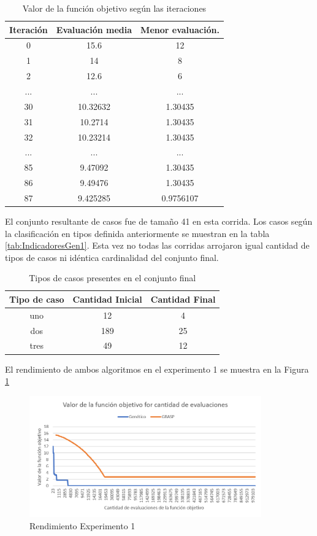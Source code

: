 \documentclass[a4paper,openright,11pt,oneside]{book}
\begin{document}
	\begin{table}[h]
		\begin{center}
			\begin{tabular}{| c | c | c |} \hline
				Iteración & Evaluación media & Menor evaluación. \\ \hline
				0 & 15.6 & 12 \\
				1 & 14 & 8 \\
				2 & 12.6 & 6 \\
				... & ... & ... \\
				30 & 10.32632 & 1.30435\\
				31 & 10.2714 & 1.30435\\
				32 & 10.23214 & 1.30435\\
				... & ... & ...\\
				85 & 9.47092 & 1.30435\\
				86 & 9.49476 & 1.30435\\
				87 & 9.425285 & 0.9756107 \\ \hline
			\end{tabular}
			\caption{Valor de la función objetivo según las iteraciones}
			\label{tab:foGen1}
		\end{center}
	\end{table}

	El conjunto resultante de casos fue de tamaño 41 en esta corrida. Los casos según la clasificación en tipos definida anteriormente se muestran en la tabla \ref{tab:IndicadoresGen1}. Esta vez no todas las corridas arrojaron igual cantidad de tipos de casos ni idéntica cardinalidad del conjunto final.

	\begin{table}[h]
		\begin{center}
			\begin{tabular}{| c | c | c |} \hline
				Tipo de caso & Cantidad Inicial & Cantidad Final \\ \hline
				uno & 12 & 4 \\
				dos & 189 & 25 \\
				tres & 49 & 12 \\ \hline
			\end{tabular}
			\caption{Tipos de casos presentes en el conjunto final}
			\label{tab:TiposdecasosGen1}
		\end{center}
	\end{table}

	El rendimiento de ambos algoritmos en el experimento 1 se muestra en la Figura \ref{CallsMP}
	
	\begin{figure}[h!]
		\centering
		\includegraphics[width=10cm]{./Graphics/Calls-MP.png}
		\caption{Rendimiento Experimento 1}
		\label{CallsMP}
	\end{figure}
\end{document}
